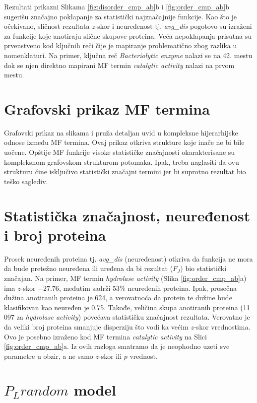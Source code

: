 Rezultati prikazni Slikama \ref{fig:disorder_cmp_ab}b i
\ref{fig:order_cmp_ab}b sugerišu značajno poklapanje za statistički
najznačajnije funkcije. Kao što je očekivano, sličnost rezultata $z$-skor i
neuređenost tj. \textit{avg\_dis} pogotovo su izraženi za funkcije koje anotiraju
slične skupove proteina. Veća nepoklapanja prisutna su prvenstveno kod ključnih
reči čije je mapiranje problematično zbog razlika u nomenklaturi. Na primer,
ključna reč \textit{Bacteriolytic enzyme} nalazi se na 42. mestu dok se njen
direktno mapirani MF termin \textit{catalytic activity} nalazi na prvom mestu.

\section{Grafovski prikaz MF termina}

Grafovski prikaz na slikama  i  pruža
detaljan uvid u kompleksne hijerarhijske odnose između MF termina. Ovaj prikaz otkriva
strukture koje inače ne bi bile uočene.  Opštije MF funkcije visoke statističke
značajnosti okarakterisane su kompleksnom grafovskom strukturom potomaka. Ipak,
treba naglasiti da ovu strukturu čine isključivo statistički značajni termini
jer bi suprotno rezultat bio  teško saglediv.

\section{Statistička značajnost, neuređenost i broj proteina}

Prosek neuređenih proteina tj. \textit{avg\_dis} (neuređenost) otkriva da
funkcija ne mora da bude pretežno neuređena ili uređena da bi rezultat ($F_J$)
bio statistički značajan.  Na primer, MF termin \textit{hydrolase activity}
(Slika \ref{fig:order_cmp_ab}a) ima $z$-skor $-27.76$, međutim sadrži $53\%$
neuređenih proteina. Ipak, prosečna dužina anotiranih proteina je 624, a
verovatnoća da protein te dužine bude klasifikovan kao neuređen je 0.75.
Takođe, veličina skupa anotiranih proteina (11 097 za \textit{hydrolase
activity}) povećava statističku značajnost rezultata. Verovatno je da veliki
broj proteina smanjuje disperziju što vodi ka većim $z$-skor vrednostima.  Ovo
je posebno izraženo kod MF termina \textit{catalytic activity} na Slici
\ref{fig:order_cmp_ab}a.  Iz ovih razloga smatramo da je neophodno uzeti sve
parametre u obzir, a ne samo $z$-skor ili $p$ vrednost.

\section{$P_Lrandom$ model}

